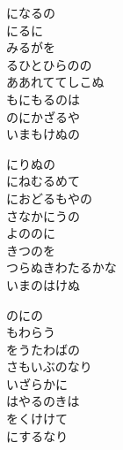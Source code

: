 \documentclass[10pt,b5j]{tarticle} %
\begin{document}
\begin{enumerate}
\begin{minipage}[c]{\blocksize}
        \vspace{\linespace}
        \item
        になるの\\
        にるに\\
        みるがを\\
        るひとひらのの\\
        ああれててしこぬ\\
        もにもるのは\\
        のにかざるや\\
        いまもけぬの
        
        \vspace{\linespace}
        \item
        にりぬの\\
        にねむるめて\\
        におどるもやの\\
        さなかにうの\\
        よののに\\
        きつのを\\
        つらぬきわたるかな\\
        いまのはけぬ
        
        \vspace{\linespace}
        \item
        のにの\\
        もわらう\\
        をうたわばの\\
        さもいぶのなり\\
        いざらかに\\
        はやるのきは\\
        をくけけて\\
        にするなり
    
    \end{minipage}
\end{enumerate} %
\end{document}
